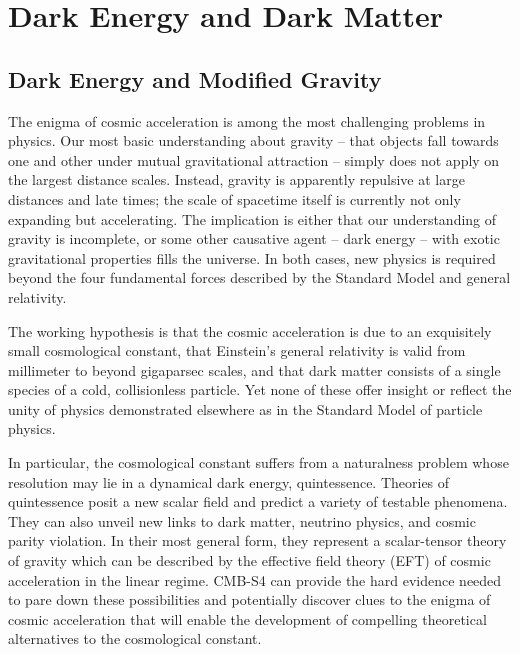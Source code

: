
\chapter{Dark Energy and Dark Matter}

\section{Dark Energy and Modified Gravity}



The enigma of cosmic acceleration is among the most challenging problems in physics. Our most basic understanding about gravity -- that objects fall towards one and other under mutual gravitational attraction -- simply does not apply on the largest distance scales. Instead, gravity is apparently repulsive at large distances and late times; the scale of spacetime itself is currently not only expanding but accelerating. The implication is either that our understanding of gravity is incomplete, or some other causative agent -- dark energy -- with exotic gravitational properties fills the universe. In both cases, new physics is required beyond the four fundamental forces described by the Standard Model and general relativity.

The working hypothesis is that the cosmic acceleration is due to an exquisitely small cosmological constant, that Einstein's general relativity is valid from millimeter to beyond gigaparsec scales, and that dark matter consists of a single species of a cold, collisionless particle. Yet none of these offer insight or reflect the unity of physics demonstrated elsewhere as in the Standard Model of particle physics.

In particular, the cosmological constant suffers from a naturalness problem whose resolution may lie in a dynamical dark energy, quintessence. Theories of quintessence posit a new scalar field and predict a variety of testable phenomena.  They can also unveil new links to dark matter, neutrino physics, and cosmic parity violation. In their most general form, they represent
a scalar-tensor theory of gravity which can be described by  the effective field theory (EFT) of cosmic acceleration in the linear regime. 
CMB-S4 can provide the hard evidence  needed to pare down these possibilities and potentially discover clues to the enigma of cosmic acceleration that will enable the development of  compelling theoretical 
alternatives to the cosmological constant.

